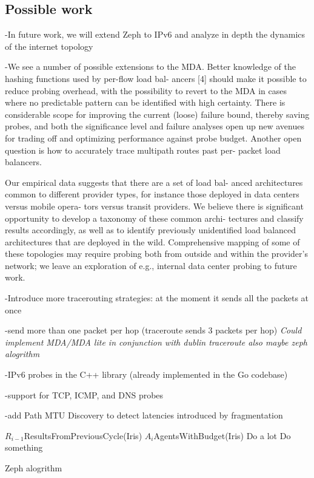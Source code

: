 \subsection{Possible work}

-In future work, we will extend Zeph to IPv6 and analyze in depth
the dynamics of the internet topology

-We see a number of possible extensions to the MDA. Better
knowledge of the hashing functions used by per-flow load bal-
ancers [4] should make it possible to reduce probing overhead,
with the possibility to revert to the MDA in cases where no
predictable pattern can be identified with high certainty. There
is considerable scope for improving the current (loose) failure
bound, thereby saving probes, and both the significance level
and failure analyses open up new avenues for trading off and
optimizing performance against probe budget. Another open
question is how to accurately trace multipath routes past per-
packet load balancers.

Our empirical data suggests that there are a set of load bal-
anced architectures common to different provider types, for
instance those deployed in data centers versus mobile opera-
tors versus transit providers. We believe there is significant
opportunity to develop a taxonomy of these common archi-
tectures and classify results accordingly, as well as to identify
previously unidentified load balanced architectures that are
deployed in the wild. Comprehensive mapping of some of
these topologies may require probing both from outside and
within the provider’s network; we leave an exploration of e.g.,
internal data center probing to future work.

-Introduce more tracerouting strategies: at the moment it sends all the packets at once

-send more than one packet per hop (traceroute sends 3 packets per hop) \textit{Could implement MDA/MDA lite in conjunction with dublin traceroute also maybe zeph alogrithm}

-IPv6 probes in the C++ library (already implemented in the Go codebase)

-support for TCP, ICMP, and DNS probes

-add Path MTU Discovery to detect latencies introduced by fragmentation


\begin{algorithm}[!ht]
\DontPrintSemicolon
    {
        $R_{i-1}$\gets ResultsFromPreviousCycle(Iris)
        $A_i$\gets AgentsWithBudget(Iris)
        {Do a lot}
    }
   {
   		Do something\;
   }

\caption{Zeph alogrithm}
\end{algorithm}